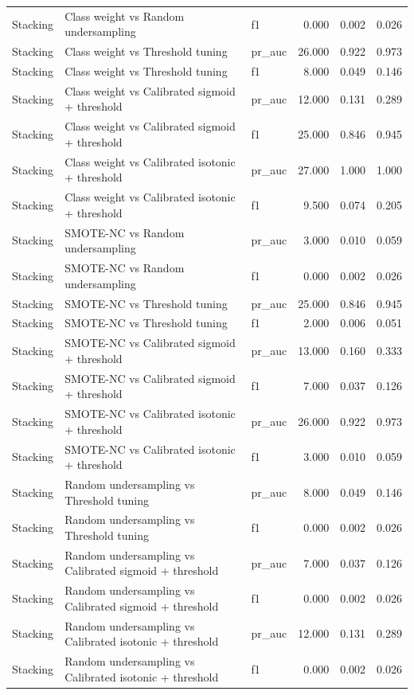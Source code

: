 \begin{tabular}{lllrrr}
Stacking & Class weight vs Random undersampling & f1 & 0.000 & 0.002 & 0.026 \\
Stacking & Class weight vs Threshold tuning & pr_auc & 26.000 & 0.922 & 0.973 \\
Stacking & Class weight vs Threshold tuning & f1 & 8.000 & 0.049 & 0.146 \\
Stacking & Class weight vs Calibrated sigmoid + threshold & pr_auc & 12.000 & 0.131 & 0.289 \\
Stacking & Class weight vs Calibrated sigmoid + threshold & f1 & 25.000 & 0.846 & 0.945 \\
Stacking & Class weight vs Calibrated isotonic + threshold & pr_auc & 27.000 & 1.000 & 1.000 \\
Stacking & Class weight vs Calibrated isotonic + threshold & f1 & 9.500 & 0.074 & 0.205 \\
Stacking & SMOTE-NC vs Random undersampling & pr_auc & 3.000 & 0.010 & 0.059 \\
Stacking & SMOTE-NC vs Random undersampling & f1 & 0.000 & 0.002 & 0.026 \\
Stacking & SMOTE-NC vs Threshold tuning & pr_auc & 25.000 & 0.846 & 0.945 \\
Stacking & SMOTE-NC vs Threshold tuning & f1 & 2.000 & 0.006 & 0.051 \\
Stacking & SMOTE-NC vs Calibrated sigmoid + threshold & pr_auc & 13.000 & 0.160 & 0.333 \\
Stacking & SMOTE-NC vs Calibrated sigmoid + threshold & f1 & 7.000 & 0.037 & 0.126 \\
Stacking & SMOTE-NC vs Calibrated isotonic + threshold & pr_auc & 26.000 & 0.922 & 0.973 \\
Stacking & SMOTE-NC vs Calibrated isotonic + threshold & f1 & 3.000 & 0.010 & 0.059 \\
Stacking & Random undersampling vs Threshold tuning & pr_auc & 8.000 & 0.049 & 0.146 \\
Stacking & Random undersampling vs Threshold tuning & f1 & 0.000 & 0.002 & 0.026 \\
Stacking & Random undersampling vs Calibrated sigmoid + threshold & pr_auc & 7.000 & 0.037 & 0.126 \\
Stacking & Random undersampling vs Calibrated sigmoid + threshold & f1 & 0.000 & 0.002 & 0.026 \\
Stacking & Random undersampling vs Calibrated isotonic + threshold & pr_auc & 12.000 & 0.131 & 0.289 \\
Stacking & Random undersampling vs Calibrated isotonic + threshold & f1 & 0.000 & 0.002 & 0.026 \\

\end{tabular}
